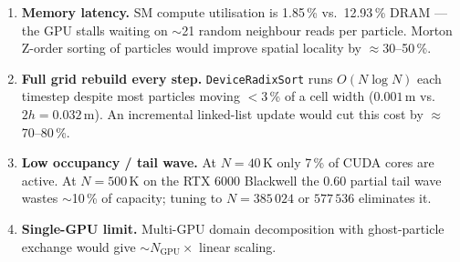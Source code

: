 \documentclass[11pt,a4paper]{article}
\begin{document}
\begin{enumerate}[leftmargin=1.5em, itemsep=3pt]
  \item \textbf{Memory latency.} SM compute utilisation is 1.85\,\% vs.\ 12.93\,\% DRAM — the GPU stalls waiting on $\sim$21 random neighbour reads per particle. Morton Z-order sorting of particles would improve spatial locality by $\approx$30–50\,\%.
  \item \textbf{Full grid rebuild every step.} \texttt{DeviceRadixSort} runs $O(N\log N)$ each timestep despite most particles moving $<$3\,\% of a cell width ($0.001$\,m vs.\ $2h = 0.032$\,m). An incremental linked-list update would cut this cost by $\approx$70–80\,\%.
  \item \textbf{Low occupancy / tail wave.} At $N = 40\,\text{K}$ only 7\,\% of CUDA cores are active. At $N = 500\,\text{K}$ on the RTX 6000 Blackwell the 0.60 partial tail wave wastes $\sim$10\,\% of capacity; tuning to $N = 385\,024$ or $577\,536$ eliminates it.
  \item \textbf{Single-GPU limit.} Multi-GPU domain decomposition with ghost-particle exchange would give $\sim N_\text{GPU}\times$ linear scaling.
\end{enumerate}
\end{document}
